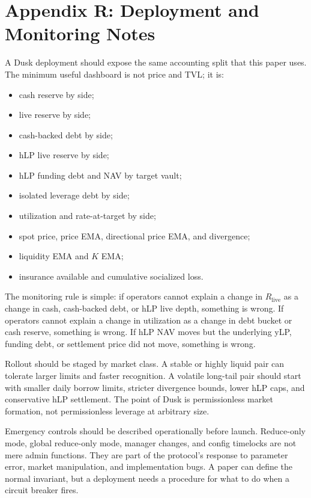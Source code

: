 \documentclass[11pt]{article}
\newcommand{\live}{\mathrm{live}}
\begin{document}
\section{Appendix R: Deployment and Monitoring Notes}

A Dusk deployment should expose the same accounting split that this paper uses. The minimum useful dashboard is not price and TVL; it is:
\begin{itemize}
  \item cash reserve by side;
  \item live reserve by side;
  \item cash-backed debt by side;
  \item hLP live reserve by side;
  \item hLP funding debt and NAV by target vault;
  \item isolated leverage debt by side;
  \item utilization and rate-at-target by side;
  \item spot price, price EMA, directional price EMA, and divergence;
  \item liquidity EMA and $K$ EMA;
  \item insurance available and cumulative socialized loss.
\end{itemize}

The monitoring rule is simple: if operators cannot explain a change in $R_{\live}$ as a change in cash, cash-backed debt, or hLP live depth, something is wrong. If operators cannot explain a change in utilization as a change in debt bucket or cash reserve, something is wrong. If hLP NAV moves but the underlying yLP, funding debt, or settlement price did not move, something is wrong.

Rollout should be staged by market class. A stable or highly liquid pair can tolerate larger limits and faster recognition. A volatile long-tail pair should start with smaller daily borrow limits, stricter divergence bounds, lower hLP caps, and conservative hLP settlement. The point of Dusk is permissionless market formation, not permissionless leverage at arbitrary size.

Emergency controls should be described operationally before launch. Reduce-only mode, global reduce-only mode, manager changes, and config timelocks are not mere admin functions. They are part of the protocol's response to parameter error, market manipulation, and implementation bugs. A paper can define the normal invariant, but a deployment needs a procedure for what to do when a circuit breaker fires.
\end{document}

